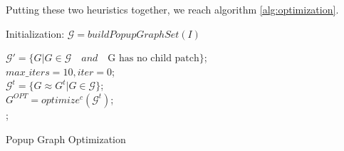 Putting these two heuristics together, we reach algorithm \ref{alg:optimization}.


\begin{algorithm}
  \SetAlgoLined
  
  Initialization: $\mathcal{G} = buildPopupGraphSet(I)$

   $\mathcal{G}' = \{G | G \in \mathcal{G} \quad and \quad \text{G has no child patch\}}$;\\
   $max\_iters = 10, iter = 0$;\\
  $\mathcal{G}^t = \{G \approx G^t | G \in \mathcal{G}\}$;\\
  $G^{OPT} = optimize^c(\mathcal{G}^t)$;\\
  ;
  \caption{Popup Graph Optimization}
\end{algorithm}
